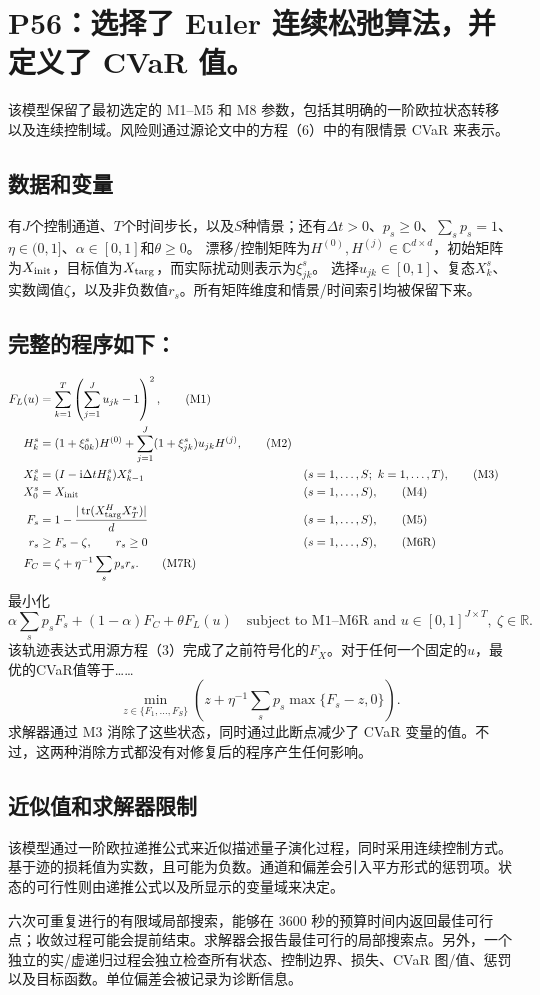 \documentclass[11pt]{article}
\begin{document}
\section*{P56：选择了 Euler 连续松弛算法，并定义了 CVaR 值。}
该模型保留了最初选定的 M1–M5 和 M8 参数，包括其明确的一阶欧拉状态转移以及连续控制域。风险则通过源论文中的方程（6）中的有限情景 CVaR 来表示。

\subsection*{数据和变量}
有$J$个控制通道、$T$个时间步长，以及$S$种情景；还有$\Delta t>0$、$p_s\ge0$、$\sum_s p_s=1$、$\eta\in(0,1]$、$\alpha\in[0,1]$和$\theta\ge0$。  
漂移/控制矩阵为$H^{(0)},H^{(j)}\in\mathbb C^{d\times d}$，初始矩阵为$X_{\rm init}$，目标值为$X_{\rm targ}$，而实际扰动则表示为$\xi_{jk}^s$。  
选择$u_{jk}\in[0,1]$、复态$X_k^s$、实数阈值$\zeta$，以及非负数值$r_s$。所有矩阵维度和情景/时间索引均被保留下来。

\subsection*{完整的程序如下：}
\begin{align}
F_L(u)&=\sum_{k=1}^T\left(\sum_{j=1}^J u_{jk}-1\right)^2, \tag{M1}\\
H_k^s&=(1+\xi_{0k}^s)H^{(0)}
       +\sum_{j=1}^J(1+\xi_{jk}^s)u_{jk}H^{(j)}, \tag{M2}\\
X_k^s&=(I-\mathrm i\Delta t H_k^s)X_{k-1}^s
      &&(s=1,\ldots,S;\ k=1,\ldots,T), \tag{M3}\\
X_0^s&=X_{\rm init} &&(s=1,\ldots,S), \tag{M4}\\
F_s&=1-\frac{|\operatorname{tr}(X_{\rm targ}^H X_T^s)|}{d}
      &&(s=1,\ldots,S), \tag{M5}\\
r_s&\ge F_s-\zeta,\qquad r_s\ge0 &&(s=1,\ldots,S), \tag{M6R}\\
F_C&=\zeta+\eta^{-1}\sum_s p_sr_s. \tag{M7R}
\end{align}
最小化
\[
 \alpha\sum_s p_sF_s+(1-\alpha)F_C+\theta F_L(u)
 \quad\text{subject to M1--M6R and }u\in[0,1]^{J\times T},\
 \zeta\in\mathbb R. \tag{M8}
\]
该轨迹表达式用源方程（3）完成了之前符号化的$F_X$。对于任何一个固定的$u$，最优的CVaR值等于……
\[
 \min_{z\in\{F_1,\ldots,F_S\}}
 \left(z+\eta^{-1}\sum_s p_s\max\{F_s-z,0\}\right).
\]
求解器通过 M3 消除了这些状态，同时通过此断点减少了 CVaR 变量的值。不过，这两种消除方式都没有对修复后的程序产生任何影响。

\subsection*{近似值和求解器限制}
该模型通过一阶欧拉递推公式来近似描述量子演化过程，同时采用连续控制方式。基于迹的损耗值为实数，且可能为负数。通道和偏差会引入平方形式的惩罚项。状态的可行性则由递推公式以及所显示的变量域来决定。

六次可重复进行的有限域局部搜索，能够在 3600 秒的预算时间内返回最佳可行点；收敛过程可能会提前结束。求解器会报告最佳可行的局部搜索点。另外，一个独立的实/虚递归过程会独立检查所有状态、控制边界、损失、CVaR 图/值、惩罚以及目标函数。单位偏差会被记录为诊断信息。
\end{document}

